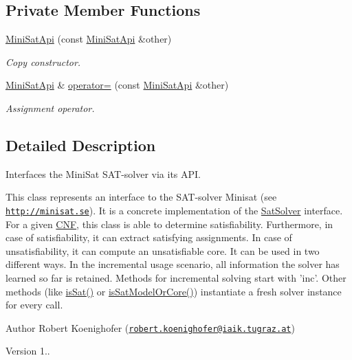 \subsection*{Private Member Functions}
\begin{DoxyCompactItemize}
\item 
\hyperlink{classMiniSatApi_a8e3fa0e62bbb5afeed319f041cf408f8}{Mini\-Sat\-Api} (const \hyperlink{classMiniSatApi}{Mini\-Sat\-Api} \&other)
\begin{DoxyCompactList}\small\item\em Copy constructor. \end{DoxyCompactList}\item 
\hyperlink{classMiniSatApi}{Mini\-Sat\-Api} \& \hyperlink{classMiniSatApi_ac8b49e6f14079c5705ae16e764d436d1}{operator=} (const \hyperlink{classMiniSatApi}{Mini\-Sat\-Api} \&other)
\begin{DoxyCompactList}\small\item\em Assignment operator. \end{DoxyCompactList}\end{DoxyCompactItemize}


\subsection{Detailed Description}
Interfaces the Mini\-Sat S\-A\-T-\/solver via its A\-P\-I. 

This class represents an interface to the S\-A\-T-\/solver Minisat (see \href{http://minisat.se}{\tt http\-://minisat.\-se}). It is a concrete implementation of the \hyperlink{classSatSolver}{Sat\-Solver} interface. For a given \hyperlink{classCNF}{C\-N\-F}, this class is able to determine satisfiability. Furthermore, in case of satisfiability, it can extract satisfying assignments. In case of unsatisfiability, it can compute an unsatisfiable core. It can be used in two different ways. In the incremental usage scenario, all information the solver has learned so far is retained. Methods for incremental solving start with 'inc'. Other methods (like \hyperlink{classMiniSatApi_a73b93ecb947723a96ef6fbd436640e12}{is\-Sat()} or \hyperlink{classMiniSatApi_a7f846d8c4a5a652cb83460852c09dfb3}{is\-Sat\-Model\-Or\-Core()}) instantiate a fresh solver instance for every call.

\begin{DoxyAuthor}{Author}
Robert Koenighofer (\href{mailto:robert.koenighofer@iaik.tugraz.at}{\tt robert.\-koenighofer@iaik.\-tugraz.\-at}) 
\end{DoxyAuthor}
\begin{DoxyVersion}{Version}
1.. 
\end{DoxyVersion}


